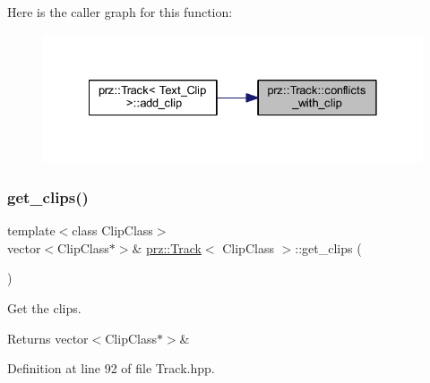 Here is the caller graph for this function\+:
\nopagebreak
\begin{figure}[H]
\begin{center}
\leavevmode
\includegraphics[width=328pt]{classprz_1_1_track_aefad1eca406d312dbafec624435b4420_icgraph}
\end{center}
\end{figure}
\mbox{\label{classprz_1_1_track_a54eb44634d26680f1851077e64991419}} 
\subsubsection{\texorpdfstring{get\_clips()}{get\_clips()}}
{\footnotesize\ttfamily template$<$class Clip\+Class$>$ \\
vector$<$Clip\+Class$\ast$$>$\& \mbox{\hyperlink{classprz_1_1_track}{prz\+::\+Track}}$<$ Clip\+Class $>$\+::get\+\_\+clips (\begin{DoxyParamCaption}{ }\end{DoxyParamCaption})\hspace{0.3cm}{\ttfamily [inline]}}



Get the clips. 

\begin{DoxyReturn}{Returns}
vector$<$\+Clip\+Class$\ast$$>$\& 
\end{DoxyReturn}


Definition at line 92 of file Track.\+hpp.

